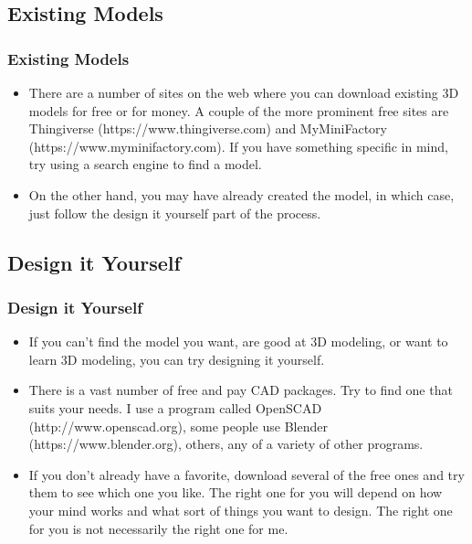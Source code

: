 \documentclass[english,10pt]{beamer}
\begin{document}
\subsection{Existing Models}
\begin{frame}
  \frametitle{Existing Models}
  \begin{itemize}
    \item There are a number of sites on the web where you can download existing 3D models for free or for money.  A couple of the more prominent free sites are Thingiverse (https://www.thingiverse.com) and MyMiniFactory (https://www.myminifactory.com).  If you have something specific in mind, try using a search engine to find a model.

    \item  On the other hand, you may have already created the model, in which case, just follow the design it yourself part of the process.
  \end{itemize}
\end{frame}

\subsection{Design it Yourself}
\begin{frame}
  \frametitle{Design it Yourself}
  \begin{itemize}
    \item If you can't find the model you want, are good at 3D modeling, or want to learn 3D modeling, you can try designing it yourself.
  
    \item There is a vast number of free and pay CAD packages.  Try to find one that suits your needs.  I use a program called OpenSCAD (http://www.openscad.org), some people use Blender (https://www.blender.org), others, any of a variety of other programs.
  
    \item If you don't already have a favorite, download several of the free ones and try them to see which one you like.  The right one for you will depend on how your mind works and what sort of things you want to design.  The right one for you is not necessarily the right one for me.
  \end{itemize}
\end{frame}
\end{document}

